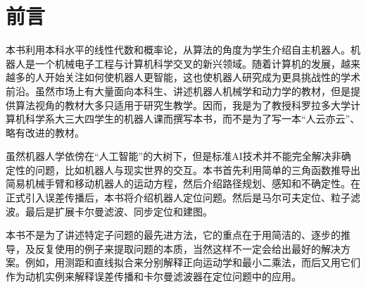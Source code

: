 \chapter*{前言}
%
本书利用本科水平的线性代数和概率论，从算法的角度为学生介绍自主机器人。机器人是一个机械电子工程与计算机科学交叉的新兴领域。随着计算机的发展，越来越多的人开始关注如何使机器人更智能，这也使机器人研究成为更具挑战性的学术前沿。虽然市场上有大量面向本科生、讲述机器人机械学和动力学的教材，但是提供算法视角的教材大多只适用于研究生教学。因而，我是为了教授科罗拉多大学计算机科学系大三大四学生的机器人课而撰写本书，而不是为了写一本“人云亦云”、略有改进的教材。

虽然机器人学依傍在“人工智能”的大树下，但是标准AI技术并不能完全解决非确定性的问题，比如机器人与现实世界的交互。本书首先利用简单的三角函数推导出简易机械手臂和移动机器人的运动方程，然后介绍路径规划、感知和不确定性。在正式引入误差传播后，本书将介绍机器人定位问题。然后是马尔可夫定位、粒子滤波。最后是扩展卡尔曼滤波、同步定位和建图。

本书不是为了讲述特定子问题的最先进方法，它的重点在于用简洁的、逐步的推导，及反复使用的例子来提取问题的本质，当然这样不一定会给出最好的解决方案。例如，用测距和直线拟合来分别解释正向运动学和最小二乘法，而后又用它们作为动机实例来解释误差传播和卡尔曼滤波器在定位问题中的应用。

